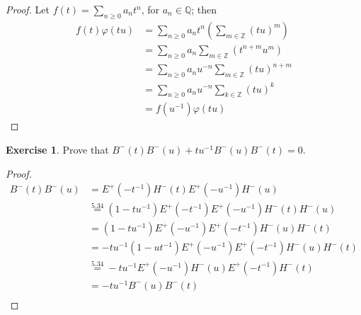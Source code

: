 \documentclass[12pt]{extarticle}
\newcommand{\Q}{\mathbb{Q}}
\newcommand{\Z}{\mathbb{Z}}
\newcommand{\<}{\langle}
\renewcommand{\>}{\rangle}
\theoremstyle{definition}
\newtheorem{exercise}{Exercise}
\begin{document}
\begin{proof}
  Let $f(t) = \sum\limits_{n \geq 0} a_n t^n$, for $a_n \in \Q$; then
  \begin{align*}
    f(t)\varphi(tu)
    &=
    \sum\limits_{n \geq 0} a_n t^n (\sum\limits_{m \in \Z} (tu)^m) \\
    &=
    \sum\limits_{n \geq 0} a_n \sum\limits_{m \in \Z} (t^{n+m} u^{m}) \\
    &=
    \sum\limits_{n \geq 0} a_nu^{-n} \sum\limits_{m \in \Z} (tu)^{n+m} \\
    &=
    \sum\limits_{n \geq 0} a_nu^{-n} \sum\limits_{k \in \Z} (tu)^{k} \\
    &=
    f(u^{-1}) \varphi(tu)
  \end{align*}
\end{proof}
\begin{exercise}
  Prove that $B^-(t)B^-(u) +tu^{-1}B^-(u)B^-(t) = 0$.
\end{exercise}
\begin{proof}
  \begin{align*}
    B^-(t)B^-(u)
    &=
    E^+(-t^{-1})H^-(t) E^+(-u^{-1})H^-(u) \\
    &\overset{5.34}{=}
    (1-tu^{-1})E^+(-t^{-1})E^+(-u^{-1})H^{-}(t)H^-(u) \\
    &=
    (1-tu^{-1})E^+(-u^{-1})E^+(-t^{-1})H^-(u)H^{-}(t) \\
    &=
    -tu^{-1}(1-ut^{-1})E^+(-u^{-1})E^+(-t^{-1})H^-(u)H^{-}(t) \\
    &\overset{5.34}{=}
    -tu^{-1}E^+(-u^{-1})H^-(u)E^+(-t^{-1})H^{-}(t)  \\
    &=
    -tu^{-1}B^-(u)B^-(t)  \\
  \end{align*}
\end{proof}
\end{document}
